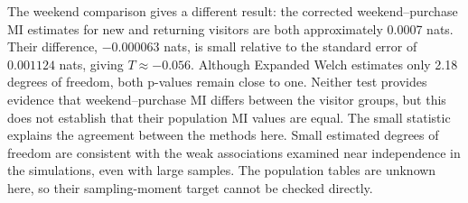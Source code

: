 The weekend comparison gives a different result: the corrected
weekend--purchase MI estimates for new and returning visitors are both
approximately 0.0007 nats. Their difference,
\(-0.000063\) nats, is small relative to the standard error of
\(0.001124\) nats, giving \(T\approx-0.056\). Although Expanded Welch
estimates only 2.18 degrees of freedom, both p-values remain close to one.
Neither test provides evidence that weekend--purchase MI differs between
the visitor groups, but this does not establish that their population MI
values are equal. The small statistic explains the agreement between the methods here.
Small estimated degrees of freedom are consistent with the weak
associations examined near independence in the simulations, even with
large samples. The population tables are unknown here, so their
sampling-moment target cannot be checked directly.
